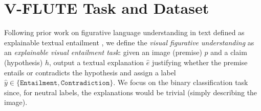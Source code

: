 
\section{V-FLUTE Task and Dataset}\label{taskdata} 

Following prior work on figurative language understanding in text defined as explainable textual entailment \cite{chakrabarty-etal-2022-flute}, we define the \emph{visual figurative understanding} as an \emph{explainable visual entailment task}: given an image (premise) $p$ and a claim (hypothesis) $h$, output a textual explanation $\hat{e}$ justifying whether the premise entails or contradicts the hypothesis and assign a label $\hat{y} \in \{ \texttt{Entailment}, \texttt{Contradiction} \}$. We focus on the binary classification task since, for neutral labels, the explanations would be trivial (simply describing the image).

